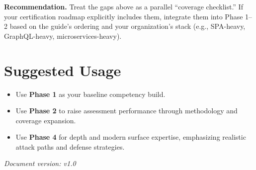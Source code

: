 \documentclass[11pt]{article}
\begin{document}
\begin{infobox}
\textbf{Recommendation.} Treat the gaps above as a parallel ``coverage checklist.'' If your certification roadmap explicitly includes them, integrate them into Phase 1--2 based on the guide's ordering and your organization's stack (e.g., SPA-heavy, GraphQL-heavy, microservices-heavy).
\end{infobox}

\section{Suggested Usage}
\begin{itemize}
  \item Use \textbf{Phase 1} as your baseline competency build.
  \item Use \textbf{Phase 2} to raise assessment performance through methodology and coverage expansion.
  \item Use \textbf{Phase 4} for depth and modern surface expertise, emphasizing realistic attack paths and defense strategies.
\end{itemize}

\vfill
\noindent\textit{Document version: v1.0}
\end{document}
